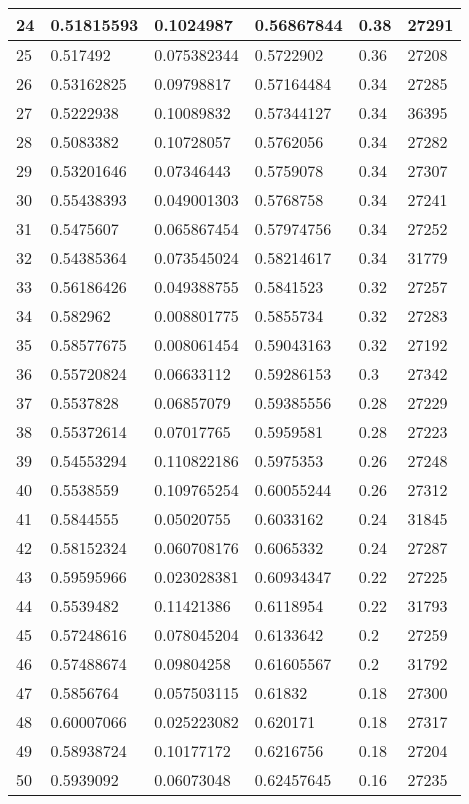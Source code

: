 \begin{longtable}{|l|l|l|l|l|l|}
24 & 0.51815593 & 0.1024987 & 0.56867844 & 0.38 & 27291 \\ \hline 
25 & 0.517492 & 0.075382344 & 0.5722902 & 0.36 & 27208 \\ \hline 
26 & 0.53162825 & 0.09798817 & 0.57164484 & 0.34 & 27285 \\ \hline 
27 & 0.5222938 & 0.10089832 & 0.57344127 & 0.34 & 36395 \\ \hline 
28 & 0.5083382 & 0.10728057 & 0.5762056 & 0.34 & 27282 \\ \hline 
29 & 0.53201646 & 0.07346443 & 0.5759078 & 0.34 & 27307 \\ \hline 
30 & 0.55438393 & 0.049001303 & 0.5768758 & 0.34 & 27241 \\ \hline 
31 & 0.5475607 & 0.065867454 & 0.57974756 & 0.34 & 27252 \\ \hline 
32 & 0.54385364 & 0.073545024 & 0.58214617 & 0.34 & 31779 \\ \hline 
33 & 0.56186426 & 0.049388755 & 0.5841523 & 0.32 & 27257 \\ \hline 
34 & 0.582962 & 0.008801775 & 0.5855734 & 0.32 & 27283 \\ \hline 
35 & 0.58577675 & 0.008061454 & 0.59043163 & 0.32 & 27192 \\ \hline 
36 & 0.55720824 & 0.06633112 & 0.59286153 & 0.3 & 27342 \\ \hline 
37 & 0.5537828 & 0.06857079 & 0.59385556 & 0.28 & 27229 \\ \hline 
38 & 0.55372614 & 0.07017765 & 0.5959581 & 0.28 & 27223 \\ \hline 
39 & 0.54553294 & 0.110822186 & 0.5975353 & 0.26 & 27248 \\ \hline 
40 & 0.5538559 & 0.109765254 & 0.60055244 & 0.26 & 27312 \\ \hline 
41 & 0.5844555 & 0.05020755 & 0.6033162 & 0.24 & 31845 \\ \hline 
42 & 0.58152324 & 0.060708176 & 0.6065332 & 0.24 & 27287 \\ \hline 
43 & 0.59595966 & 0.023028381 & 0.60934347 & 0.22 & 27225 \\ \hline 
44 & 0.5539482 & 0.11421386 & 0.6118954 & 0.22 & 31793 \\ \hline 
45 & 0.57248616 & 0.078045204 & 0.6133642 & 0.2 & 27259 \\ \hline 
46 & 0.57488674 & 0.09804258 & 0.61605567 & 0.2 & 31792 \\ \hline 
47 & 0.5856764 & 0.057503115 & 0.61832 & 0.18 & 27300 \\ \hline 
48 & 0.60007066 & 0.025223082 & 0.620171 & 0.18 & 27317 \\ \hline 
49 & 0.58938724 & 0.10177172 & 0.6216756 & 0.18 & 27204 \\ \hline 
50 & 0.5939092 & 0.06073048 & 0.62457645 & 0.16 & 27235 \\ \hline 
\end{longtable}